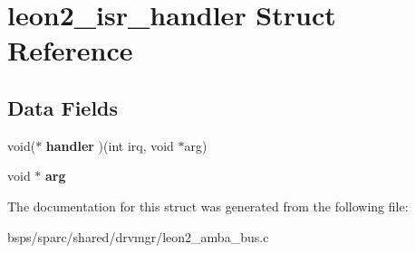\hypertarget{structleon2__isr__handler}{}\section{leon2\+\_\+isr\+\_\+handler Struct Reference}
\label{structleon2__isr__handler}
\subsection*{Data Fields}
\begin{DoxyCompactItemize}
\item 
\mbox{\label{structleon2__isr__handler_a27c477947a811c5f92c7e735ac8d9902}} 
void($\ast$ {\bfseries handler} )(int irq, void $\ast$arg)
\item 
\mbox{\label{structleon2__isr__handler_a12e6cfa655966e3c9f202f4381d56441}} 
void $\ast$ {\bfseries arg}
\end{DoxyCompactItemize}


The documentation for this struct was generated from the following file\+:\begin{DoxyCompactItemize}
\item 
bsps/sparc/shared/drvmgr/leon2\+\_\+amba\+\_\+bus.\+c\end{DoxyCompactItemize}
